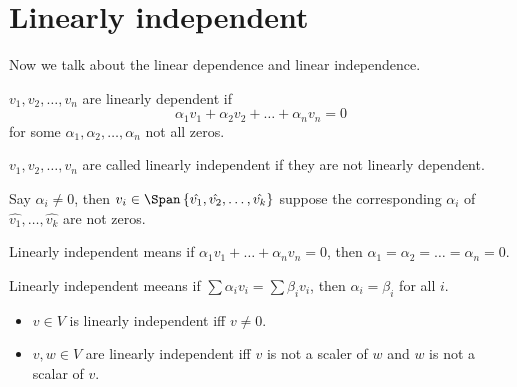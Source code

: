 \section{Linearly independent}
\begin{definition*}
    Now we talk about the linear dependence and linear independence.
    \begin{definition} \label{def: linearly dependent}
    \(v_1, v_2, \dots , v_n\) are linearly dependent if 
    \[
        \alpha _1 v_1 + \alpha _2 v_2 + \dots + \alpha _n v_n = 0
    \] for some \(\alpha _1, \alpha _2, \dots , \alpha _n\) not all zeros. 
\end{definition}

\begin{definition} \label{def: linearly independent}
    \(v_1, v_2, \dots , v_n\) are called linearly independent if they are not linearly dependent. 
\end{definition}
\end{definition*}

\begin{corollary}
    Say \(\alpha _i \neq 0\), then \(v_i \in \Span \left\{ \hat{v_1}, \hat{v_2}, \dots , \hat{v_k}   \right\} \) suppose the corresponding \(\alpha _i\) of \(\hat{v_1}, \dots , \hat{v_k}  \) are not zeros. 
\end{corollary}

\begin{corollary}
    Linearly independent means if \(\alpha _1 v_1 + \dots + \alpha _n v_n = 0\), then \(\alpha _1 = \alpha _2 = \dots = \alpha _n = 0\). 
\end{corollary}

\begin{corollary}
    Linearly independent meeans if \(\sum \alpha _i v_i = \sum \beta _i v_i  \), then \(\alpha _i = \beta _i\) for all \(i\).   
\end{corollary}

\begin{eg}
    \vphantom{text}
    \begin{itemize}
        \item \(v \in V\) is linearly independent iff \(v \neq 0\). 
        \item \(v, w \in V\) are linearly independent iff \(v\) is not a scaler of \(w\) and \(w\) is not a scalar of \(v\).       
    \end{itemize}
\end{eg}

